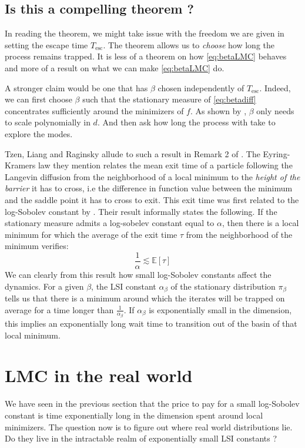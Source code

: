 \documentclass[11pt,twoside]{article}
\theoremstyle{definition}
\newcommand{\E}{\mathbb{E}}
\begin{document}
\subsection{Is this a compelling theorem ?}

In reading the theorem, we might take issue with the freedom we are given in setting the escape time $T_{\text{esc}}$. The theorem allows us to \emph{choose} how long the process remains trapped. It is less of a theorem on how \eqref{eq:betaLMC} behaves and more of a result on what we can make \eqref{eq:betaLMC} do.

A stronger claim would be one that has $\beta$ chosen independently of $T_{\text{esc}}$. Indeed, we can first choose $\beta$ such that the stationary measure of \eqref{eq:betadiff} concentrates sufficiently around the minimizers of $f$. As shown by \cite{raginsky_non-convex_2017}, $\beta$ only needs to scale polynomially in $d$. And then ask how long the process with take to explore the modes. 

Tzen, Liang and Raginsky allude to such a result in Remark 2 of \cite{tzen_local_2018}. The Eyring-Kramers law they mention relates the mean exit time of a particle following the Langevin diffusion from the neighborhood of a local minimum to the \textit{height of the barrier} it has to cross, i.e the difference in function value between the minimum and the saddle point it has to cross to exit. This exit time was first related to the log-Sobolev constant by \cite{menz_poincare_2014-1}. Their result informally states the following. If the stationary measure admits a log-sobelev constant equal to $\alpha$, then there is a local minimum for which the average of the exit time $\tau$ from the neighborhood of the minimum verifies:
\[
    \frac{1}{\alpha} \lesssim \E[\tau]
\]
We can clearly from this result how small log-Sobolev constants affect the dynamics. For a given $\beta$, the LSI constant $\alpha_\beta$ of the stationary distribution $\pi_\beta$ tells us that there is a minimum around which the iterates will be trapped on average for a time longer than $\frac{1}{\alpha_\beta}$. If $\alpha_\beta$ is exponentially small in the dimension, this implies an exponentially long wait time to transition out of the basin of that local minimum.

\section{LMC in the real world}

We have seen in the previous section that the price to pay for a small log-Sobolev constant is time exponentially long in the dimension spent around local minimizers. The question now is to figure out where real world distributions lie. Do they live in the intractable realm of exponentially small LSI constants ?
\end{document}
